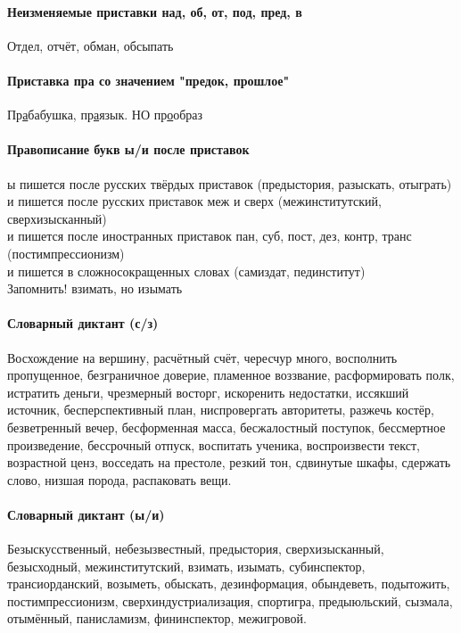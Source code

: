 \documentclass{article}
\begin{document}
\paragraph{Неизменяемые приставки над, об, от, под, пред, в}
Отдел, отчёт, обман, обсыпать

\paragraph{Приставка пра со значением "предок, прошлое"}
Пр\underline{а}бабушка, пр\underline{а}язык. НО пр\underline{о}образ

\paragraph{Правописание букв ы/и после приставок}
ы пишется после русских твёрдых приставок (предыстория, разыскать, отыграть)\\
и пишется после русских приставок меж и сверх (межинститутский, сверхизысканный)\\
и пишется после иностранных приставок пан, суб, пост, дез, контр, транс (постимпрессионизм)\\
и пишется в сложносокращенных словах (самиздат, пединститут)\\
Запомнить! взимать, но изымать

\paragraph{Словарный диктант (с/з)}

Восхождение на вершину, расчётный счёт, чересчур много, восполнить пропущенное,
безграничное доверие, пламенное воззвание, расформировать полк, истратить деньги,
чрезмерный восторг, искоренить недостатки, иссякший источник, бесперспективный план,
ниспровергать авторитеты, разжечь костёр, безветренный вечер, бесформенная масса,
бесжалостный поступок, бессмертное произведение, бессрочный отпуск, воспитать ученика,
воспроизвести текст, возрастной ценз, восседать на престоле, резкий тон, сдвинутые шкафы,
сдержать слово, низшая порода, распаковать вещи.

\paragraph{Словарный диктант (ы/и)}

Безыскусственный, небезызвестный, предыстория, сверхизысканный, безысходный,
межинститутский, взимать, изымать, субинспектор, трансиорданский, возыметь,
обыскать, дезинформация, обындеветь, подытожить, постимпрессионизм, сверхиндустриализация,
спортигра, предыюльский, сызмала, отымённый, панисламизм, фининспектор, межигровой.
\end{document}
